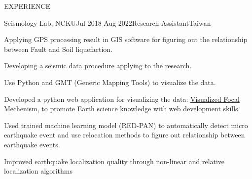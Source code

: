\documentclass{resume} %
\begin{document}
\begin{rSection}{EXPERIENCE}


\begin{rSubsection}{Seismology Lab, NCKU}{Jul 2018-Aug 2022}{Research Assistant}{Taiwan}
\item Applying GPS processing result in GIS software for figuring out the relationship between Fault and Soil liquefaction.
\item Developing a seismic data procedure applying to the research.
\item Use Python and GMT (Generic Mapping Tools) to visualize the data.
\item Developed a python web application for visualizing the data: \href{https://beachball.clam.moe}{Visualized Focal Mechenism}, to promote Earth science knowledge with web development skills.
\item Used trained machine learning model (RED-PAN) to automatically detect micro earthquake event and use relocation methods to figure out relationship between earthquake events.
\item Improved earthquake localization quality through non-linear and relative localization algorithms
\end{rSubsection}



\end{rSection}
\end{document}
